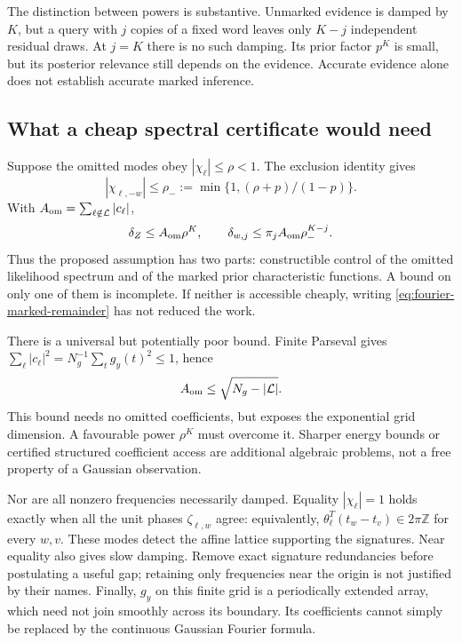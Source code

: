 \documentclass[10pt,a4paper]{article}
\begin{document}
The distinction between powers is substantive. Unmarked evidence is damped by $K$, but a query with $j$
copies of a fixed word leaves only $K-j$ independent residual draws. At $j=K$ there is no such damping.
Its prior factor $p^K$ is small, but its posterior relevance still depends on the evidence. Accurate evidence
alone does not establish accurate marked inference.

\subsection{What a cheap spectral certificate would need}
Suppose the omitted modes obey $|\chi_\ell|\leq\rho<1$. The exclusion identity gives
\[
 |\chi_{\ell,-w}|\leq\rho_-:=
       \min\{1,(\rho+p)/(1-p)\}.
\]
With $A_{\rm om}=\sum_{\ell\notin\mathcal L}|c_\ell|$,
\begin{equation}
 \delta_Z\leq A_{\rm om}\rho^K,\qquad
 \delta_{w,j}\leq\pi_j A_{\rm om}\rho_-^{K-j}.
 \label{eq:fourier-gap-bound}
\end{equation}
Thus the proposed assumption has two parts: constructible control of the omitted likelihood spectrum and
of the marked prior characteristic functions. A bound on only one of them is incomplete.
If neither is accessible cheaply, writing \eqref{eq:fourier-marked-remainder} has not reduced the work.

There is a universal but potentially poor bound. Finite Parseval gives
$\sum_\ell|c_\ell|^2=N_g^{-1}\sum_tg_y(t)^2\leq1$, hence
\[
 A_{\rm om}\leq\sqrt{N_g-|\mathcal L|}.
\]
This bound needs no omitted coefficients, but exposes the exponential grid dimension. A favourable power
$\rho^K$ must overcome it. Sharper energy bounds or certified structured coefficient access are additional
algebraic problems, not a free property of a Gaussian observation.

Nor are all nonzero frequencies necessarily damped. Equality $|\chi_\ell|=1$ holds exactly when all the
unit phases $\zeta_{\ell,w}$ agree: equivalently,
$\theta_\ell^T(t_w-t_v)\in2\pi\mathbb Z$ for every $w,v$. These modes detect the affine lattice supporting
the signatures. Near equality also gives slow damping. Remove exact signature redundancies before
postulating a useful gap; retaining only frequencies near the origin is not justified by their names.
Finally, $g_y$ on this finite grid is a periodically extended array, which need not join smoothly across its
boundary. Its coefficients cannot simply be replaced by the continuous Gaussian Fourier formula.
\end{document}
